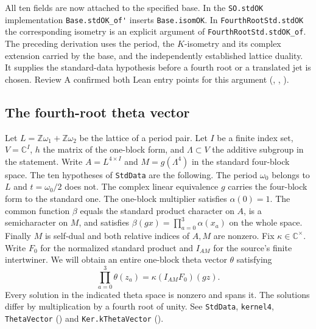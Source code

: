 All ten fields are now attached to the specified base. In the
\nolinkurl{SO.stdOK} implementation \nolinkurl{Base.stdOK_of'} inserts
\nolinkurl{Base.isomOK}. In \nolinkurl{FourthRootStd.stdOK} the
corresponding isometry is an explicit argument of
\nolinkurl{FourthRootStd.stdOK_of}. The preceding derivation uses
the period, the $K$-isometry and its complex extension carried by
the base, and the independently established lattice duality. It
supplies the standard-data hypothesis before a fourth root or a
translated jet is chosen. Review A confirmed both Lean entry points
for this argument
(,
,
).

\subsection{The fourth-root theta vector}\label{r16:ktheta}
Let $L=\mathbb Z\omega_1+\mathbb Z\omega_2$ be the lattice of a
period pair. Let $I$ be a finite index set, $V=\mathbb C^I$,
$h$ the matrix of the one-block form, and $\Lambda\subset V$ the
additive subgroup in the statement. Write $A=L^{4\times I}$ and
$M=g(\Lambda^4)$ in the standard four-block space. The ten hypotheses
of \nolinkurl{StdData} are the following. The period $\omega_0$ belongs
to $L$ and $t=\omega_0/2$ does not. The complex linear equivalence $g$
carries the four-block form to the standard one. The one-block multiplier
satisfies $\alpha(0)=1$. The common function $\beta$ equals the standard
product character on $A$, is a semicharacter on $M$, and satisfies
$\beta(gx)=\prod_{a=0}^3\alpha(x_a)$ on the whole space. Finally $M$ is
self-dual and both relative indices of $A,M$ are nonzero. Fix
$\kappa\in\mathbb C^\times$. Write $F_0$ for the normalized standard
product and $I_{AM}$ for the source's finite intertwiner. We will obtain
an entire one-block theta vector $\theta$ satisfying
\[
 \prod_{a=0}^3\theta(z_a)=\kappa (I_{AM}F_0)(g z).
\]
Every solution in the indicated theta space is nonzero and spans it.
The solutions differ by multiplication by a fourth root of unity.
See \nolinkurl{StdData}, \nolinkurl{kernel4}, \nolinkurl{ThetaVector}
() and
\nolinkurl{Ker.kThetaVector}
().

